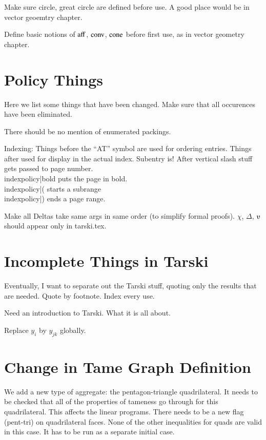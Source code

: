 Make sure circle, great circle are defined before use.
A good place would be in vector geoemtry chapter.

Define basic notions of ${\operatorname{aff}}$, ${\operatorname{conv}}$, ${\operatorname{cone}}$
before first use, as in vector geometry chapter.


\section{Policy Things}

Here we list some things that have been changed.  Make sure that
all occurences have been eliminated.

There should be no mention of enumerated packings.

Indexing: Things before the ``AT'' symbol are used for ordering entries.
Things after used for display in the actual index.
Subentry is!  After vertical slash stuff gets passed to page
number.  \\index{policy|bold}  puts the page in bold.
\\index{policy|(} starts a subrange \\index{policy|)} ends a page range.

Make all Deltas take same args in same order (to simplify formal proofs).
$\chi$, $\Delta$, $\ups$ should appear only in tarski.tex. 

\section{Incomplete Things in Tarski}

Eventually, I want to separate out the Tarski stuff, quoting
only the results that are needed.  Quote by footnote. Index every use.

Need an introduction to Tarski. What it is all about.

Replace $y_i$ by $y_{jk}$ globally.


\section{Change in Tame Graph Definition}

We add a new type of aggregate: the pentagon-triangle quadrilateral.
It needs to be checked that all of the properties of tameness go
through for this quadrilateral.  This affects the linear programs.
There needs to be a new flag (pent-tri) on quadrilateral faces.
None of the other inequalities for quads are valid in this case.
It has to be run as a separate initial case.

